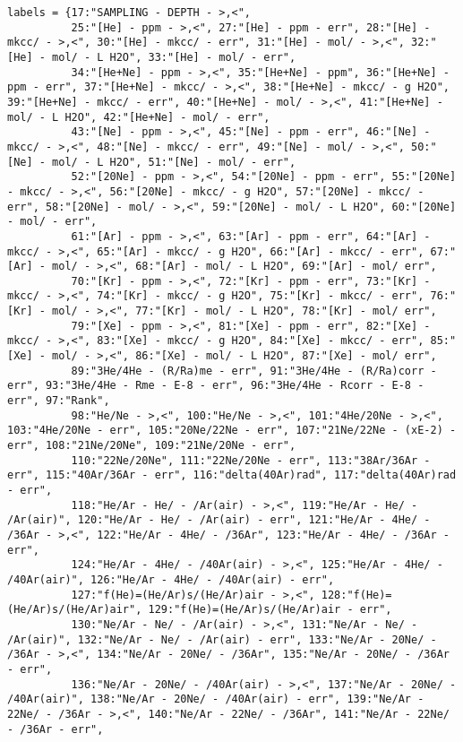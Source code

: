\begin{verbatim}
labels = {17:"SAMPLING - DEPTH - >,<",
		  25:"[He] - ppm - >,<", 27:"[He] - ppm - err", 28:"[He] - mkcc/ - >,<", 30:"[He] - mkcc/ - err", 31:"[He] - mol/ - >,<", 32:"[He] - mol/ - L H2O", 33:"[He] - mol/ - err",
		  34:"[He+Ne] - ppm - >,<", 35:"[He+Ne] - ppm", 36:"[He+Ne] - ppm - err", 37:"[He+Ne] - mkcc/ - >,<", 38:"[He+Ne] - mkcc/ - g H2O", 39:"[He+Ne] - mkcc/ - err", 40:"[He+Ne] - mol/ - >,<", 41:"[He+Ne] - mol/ - L H2O", 42:"[He+Ne] - mol/ - err",
		  43:"[Ne] - ppm - >,<", 45:"[Ne] - ppm - err", 46:"[Ne] - mkcc/ - >,<", 48:"[Ne] - mkcc/ - err", 49:"[Ne] - mol/ - >,<", 50:"[Ne] - mol/ - L H2O", 51:"[Ne] - mol/ - err",
		  52:"[20Ne] - ppm - >,<", 54:"[20Ne] - ppm - err", 55:"[20Ne] - mkcc/ - >,<", 56:"[20Ne] - mkcc/ - g H2O", 57:"[20Ne] - mkcc/ - err", 58:"[20Ne] - mol/ - >,<", 59:"[20Ne] - mol/ - L H2O", 60:"[20Ne] - mol/ - err",
		  61:"[Ar] - ppm - >,<", 63:"[Ar] - ppm - err", 64:"[Ar] - mkcc/ - >,<", 65:"[Ar] - mkcc/ - g H2O", 66:"[Ar] - mkcc/ - err", 67:"[Ar] - mol/ - >,<", 68:"[Ar] - mol/ - L H2O", 69:"[Ar] - mol/ err",
 		  70:"[Kr] - ppm - >,<", 72:"[Kr] - ppm - err", 73:"[Kr] - mkcc/ - >,<", 74:"[Kr] - mkcc/ - g H2O", 75:"[Kr] - mkcc/ - err", 76:"[Kr] - mol/ - >,<", 77:"[Kr] - mol/ - L H2O", 78:"[Kr] - mol/ err",
		  79:"[Xe] - ppm - >,<", 81:"[Xe] - ppm - err", 82:"[Xe] - mkcc/ - >,<", 83:"[Xe] - mkcc/ - g H2O", 84:"[Xe] - mkcc/ - err", 85:"[Xe] - mol/ - >,<", 86:"[Xe] - mol/ - L H2O", 87:"[Xe] - mol/ err",
		  89:"3He/4He - (R/Ra)me - err", 91:"3He/4He - (R/Ra)corr - err", 93:"3He/4He - Rme - E-8 - err", 96:"3He/4He - Rcorr - E-8 - err", 97:"Rank",
		  98:"He/Ne - >,<", 100:"He/Ne - >,<", 101:"4He/20Ne - >,<", 103:"4He/20Ne - err", 105:"20Ne/22Ne - err", 107:"21Ne/22Ne - (xE-2) - err", 108:"21Ne/20Ne", 109:"21Ne/20Ne - err",
		  110:"22Ne/20Ne", 111:"22Ne/20Ne - err", 113:"38Ar/36Ar - err", 115:"40Ar/36Ar - err", 116:"delta(40Ar)rad", 117:"delta(40Ar)rad - err",
		  118:"He/Ar - He/ - /Ar(air) - >,<", 119:"He/Ar - He/ - /Ar(air)", 120:"He/Ar - He/ - /Ar(air) - err", 121:"He/Ar - 4He/ - /36Ar - >,<", 122:"He/Ar - 4He/ - /36Ar", 123:"He/Ar - 4He/ - /36Ar - err",
		  124:"He/Ar - 4He/ - /40Ar(air) - >,<", 125:"He/Ar - 4He/ - /40Ar(air)", 126:"He/Ar - 4He/ - /40Ar(air) - err",
		  127:"f(He)=(He/Ar)s/(He/Ar)air - >,<", 128:"f(He)=(He/Ar)s/(He/Ar)air", 129:"f(He)=(He/Ar)s/(He/Ar)air - err",
		  130:"Ne/Ar - Ne/ - /Ar(air) - >,<", 131:"Ne/Ar - Ne/ - /Ar(air)", 132:"Ne/Ar - Ne/ - /Ar(air) - err", 133:"Ne/Ar - 20Ne/ - /36Ar - >,<", 134:"Ne/Ar - 20Ne/ - /36Ar", 135:"Ne/Ar - 20Ne/ - /36Ar - err",
		  136:"Ne/Ar - 20Ne/ - /40Ar(air) - >,<", 137:"Ne/Ar - 20Ne/ - /40Ar(air)", 138:"Ne/Ar - 20Ne/ - /40Ar(air) - err", 139:"Ne/Ar - 22Ne/ - /36Ar - >,<", 140:"Ne/Ar - 22Ne/ - /36Ar", 141:"Ne/Ar - 22Ne/ - /36Ar - err",

\end{verbatim}
